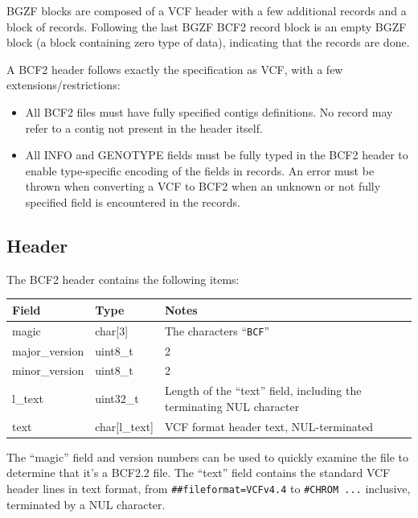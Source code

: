 \documentclass[8pt]{article}
\begin{document}
BGZF blocks are composed of a VCF header with a few additional records and a block of records.
Following the last BGZF BCF2 record block is an empty BGZF block (a block containing zero type of data), indicating that the records are done.

A BCF2 header follows exactly the specification as VCF, with a few extensions/restrictions:
\begin{itemize}
  \item All BCF2 files must have fully specified contigs definitions.
  No record may refer to a contig not present in the header itself.

  \item All INFO and GENOTYPE fields must be fully typed in the BCF2 header to enable type-specific encoding of the fields in records.
  An error must be thrown when converting a VCF to BCF2 when an unknown or not fully specified field is encountered in the records.
\end{itemize}

\subsection{Header}

The BCF2 header contains the following items:

\vspace{0.3cm}
{\small
\begin{tabular}{|l | l | p{30em} | } \hline
\textbf{Field} & \textbf{Type} & \textbf{Notes} \\ \hline
magic          & char[3]     & The characters ``{\tt BCF}'' \\ \hline
major\_version & uint8\_t    & 2 \\ \hline
minor\_version & uint8\_t    & 2 \\ \hline
l\_text        & uint32\_t   & Length of the ``text'' field, including the terminating NUL character \\ \hline
text           & char[l\_text] & VCF format header text, NUL-terminated \\ \hline
\end{tabular}}
\vspace{0.3cm}

The ``magic'' field and version numbers can be used to quickly examine the file to determine that it's a BCF2.2 file.
The ``text'' field contains the standard VCF header lines in text format, from \verb|##fileformat=VCFv4.4|
to \verb|#CHROM ...| inclusive, terminated by a NUL character.
\end{document}
